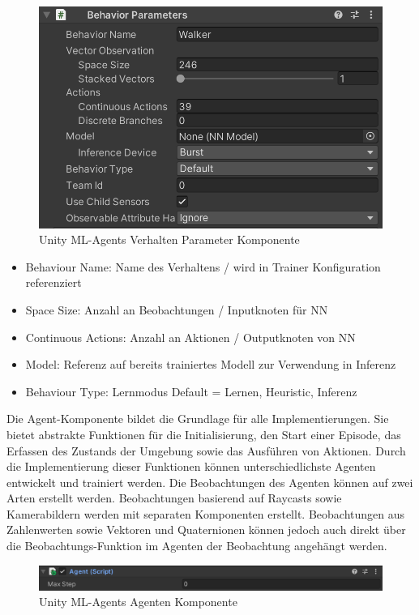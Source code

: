 \begin{figure}[H]
  \centering  
  \includegraphics[scale=0.5]{img/verhalten_komponente.png}
  \caption{Unity ML-Agents Verhalten Parameter Komponente}
  \label{fig:verhalten_komponente}
\end{figure}

\begin{itemize}
  \item Behaviour Name: Name des Verhaltens / wird in Trainer Konfiguration referenziert
  \item Space Size: Anzahl an Beobachtungen / Inputknoten für NN
  \item Continuous Actions: Anzahl an Aktionen / Outputknoten von NN
  \item Model: Referenz auf bereits trainiertes Modell zur Verwendung in Inferenz
  \item Behaviour Type: Lernmodus Default = Lernen, Heuristic, Inferenz
\end{itemize}

Die Agent-Komponente bildet die Grundlage für alle Implementierungen. Sie bietet abstrakte Funktionen für die Initialisierung, den Start einer Episode, das Erfassen des Zustands der Umgebung sowie das Ausführen von Aktionen. Durch die Implementierung dieser Funktionen können unterschiedlichste Agenten entwickelt und trainiert werden. Die Beobachtungen des Agenten können auf zwei Arten erstellt werden. Beobachtungen basierend auf Raycasts sowie Kamerabildern werden mit separaten Komponenten erstellt. Beobachtungen aus Zahlenwerten sowie Vektoren und Quaternionen können jedoch auch direkt über die Beobachtungs-Funktion im Agenten der Beobachtung angehängt werden.

\begin{figure}[H]
  \centering
  \includegraphics[scale=0.5]{img/agent_komponente}
  \caption{Unity ML-Agents Agenten Komponente}
  \label{fig:agent_komponente}
\end{figure}

